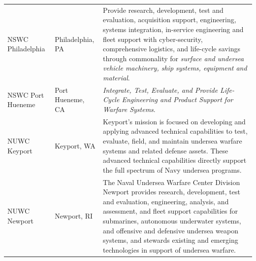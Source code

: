 \documentclass[../main.tex]{subfiles}
\begin{document}
\begin{tabularx}{\textwidth}{@{} >{\RaggedRight\arraybackslash}p{} >{\RaggedRight\arraybackslash}p{} >{\RaggedRight\arraybackslash}X @{}}
  NSWC Philadelphia & Philadelphia, PA & Provide research, development, test and evaluation, acquisition support, engineering, systems integration, in-service engineering and fleet support with cyber-security, comprehensive logistics, and life-cycle savings through commonality for \emph{surface and undersea vehicle machinery, ship systems, equipment and material}. \\
  NSWC Port Hueneme & Port Hueneme, CA & \emph{Integrate, Test, Evaluate, and Provide Life-Cycle Engineering and Product Support for Warfare Systems}. \\
  \midrule
  NUWC Keyport & Keyport, WA & Keyport's mission is focused on developing and applying advanced technical capabilities to test, evaluate, field, and maintain undersea warfare systems and related defense assets. These advanced technical capabilities directly support the full spectrum of Navy undersea programs. \\
  NUWC Newport & Newport, RI & The Naval Undersea Warfare Center Division Newport provides research, development, test and evaluation, engineering, analysis, and assessment, and fleet support capabilities for submarines, autonomous underwater systems, and offensive and defensive undersea weapon systems, and stewards existing and emerging technologies in support of undersea warfare. \\
  \bottomrule
\end{tabularx}
\end{document}
